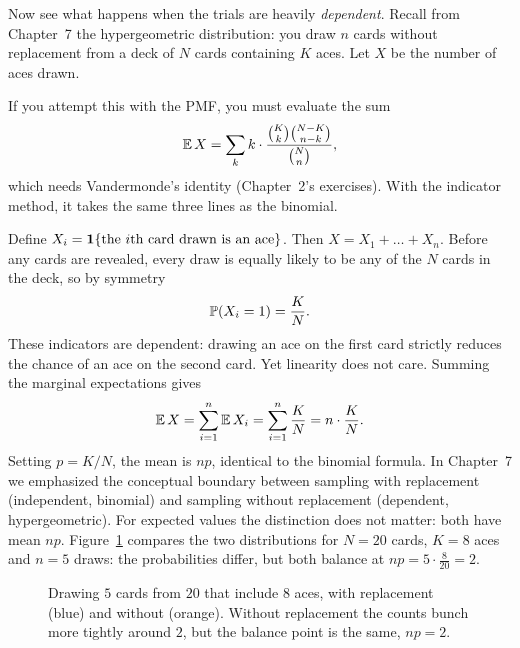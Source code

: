 Now see what happens when the trials are heavily \emph{dependent}. Recall from
Chapter~7 the hypergeometric distribution: you draw $n$ cards without
replacement from a deck of $N$ cards containing $K$ aces. Let $X$ be the number
of aces drawn.

If you attempt this with the PMF, you must evaluate the sum
\[
  \E X = \sum_{k} k \cdot \frac{\binom{K}{k}\binom{N-K}{n-k}}{\binom{N}{n}},
\]
which needs Vandermonde's identity (Chapter~2's exercises). With the indicator method,
it takes the same three lines as the binomial.

Define $X_i = \ind\{\text{the } i\text{th card drawn is an ace}\}$. Then $X =
X_1 + \dots + X_n$. Before any cards are revealed, every draw is equally likely
to be any of the $N$ cards in the deck, so by symmetry
\[
  \P(X_i = 1) = \frac{K}{N}.
\]
These indicators are dependent: drawing an ace on the first card strictly
reduces the chance of an ace on the second card. Yet linearity does not care.
Summing the marginal expectations gives
\[
  \E X = \sum_{i=1}^n \E X_i = \sum_{i=1}^n \frac{K}{N} = n \cdot \frac{K}{N}.
\]
Setting $p = K/N$, the mean is $np$, identical to the binomial formula.
In Chapter~7 we emphasized the conceptual boundary between sampling with
replacement (independent, binomial) and sampling without replacement (dependent,
hypergeometric). For expected values the distinction does not matter: both have
mean $np$. Figure~\ref{ch08:fig-hyper-binom} compares the two distributions for
$N=20$ cards, $K=8$ aces and $n=5$ draws: the probabilities differ, but both
balance at $np = 5\cdot\tfrac{8}{20} = 2$.

\begin{figure}[H]
\centering
{}
\caption{Drawing $5$ cards from $20$ that include $8$ aces, with replacement
(blue) and without (orange). Without replacement the counts bunch more tightly
around $2$, but the balance point is the same, $np = 2$.}
\label{ch08:fig-hyper-binom}
\end{figure}

